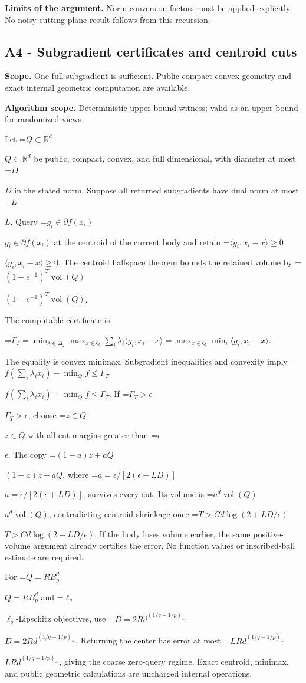 \documentclass[10pt,a4paper]{article}
\newcommand{\AtlasMath}[1]{\par\begingroup\centering\setbox0=\hbox{$\displaystyle #1$}\ifdim\wd0>1.4\linewidth\typeout{ATLAS WIDE FORMULA: \the\wd0}\fi\ifdim\wd0>\linewidth\resizebox{\linewidth}{!}{\box0}\else\box0\fi\par\endgroup}
\newcommand{\AtlasInlineMath}[1]{\begingroup\setbox0=\hbox{$#1$}\ifdim\wd0>.4\linewidth\endgroup\AtlasMath{#1}\else\endgroup$#1$\fi}
\begin{document}
\textbf{Limits of the argument.} Norm-conversion factors must be applied explicitly. No noisy cutting-plane result follows from this recursion.

\subsection{A4 - Subgradient certificates and centroid cuts}
\textbf{Scope.} One full subgradient is sufficient. Public compact convex geometry and exact internal geometric computation are available.

\textbf{Algorithm scope.} Deterministic upper-bound witness; valid as an upper bound for randomized views.

Let \AtlasInlineMath{Q\subset\mathbb R^d} be public, compact, convex, and full dimensional, with diameter at most \AtlasInlineMath{D} in the stated norm. Suppose all returned subgradients have dual norm at most \AtlasInlineMath{L}. Query \AtlasInlineMath{g_i\in\partial f(x_i)} at the centroid of the current body and retain \AtlasInlineMath{\langle g_i,x_i-x\rangle\ge0}. The centroid halfspace theorem bounds the retained volume by \AtlasInlineMath{(1-e^{-1})^T\operatorname{vol}(Q)}.

The computable certificate is

\AtlasMath{\Gamma_T=\min_{\lambda\in\Delta_T}\max_{x\in Q}\sum_i\lambda_i\langle g_i,x_i-x\rangle
=\max_{x\in Q}\min_i\langle g_i,x_i-x\rangle.}

The equality is convex minimax. Subgradient inequalities and convexity imply
\AtlasInlineMath{f(\sum_i\lambda_ix_i)-\min_Qf\le\Gamma_T}.
If \AtlasInlineMath{\Gamma_T>\epsilon}, choose \AtlasInlineMath{z\in Q} with all cut margins greater than \AtlasInlineMath{\epsilon}. The copy \AtlasInlineMath{(1-a)z+aQ}, where \AtlasInlineMath{a=\epsilon/[2(\epsilon+LD)]}, survives every cut. Its volume is \AtlasInlineMath{a^d\operatorname{vol}(Q)}, contradicting centroid shrinkage once \AtlasInlineMath{T>C d\log(2+LD/\epsilon)}. If the body loses volume earlier, the same positive-volume argument already certifies the error. No function values or inscribed-ball estimate are required.

For \AtlasInlineMath{Q=RB_p^d} and \AtlasInlineMath{\ell_q}-Lipschitz objectives, use \AtlasInlineMath{D=2Rd^{(1/q-1/p)_+}}. Returning the center has error at most \AtlasInlineMath{LRd^{(1/q-1/p)_+}}, giving the coarse zero-query regime. Exact centroid, minimax, and public geometric calculations are uncharged internal operations.
\end{document}
